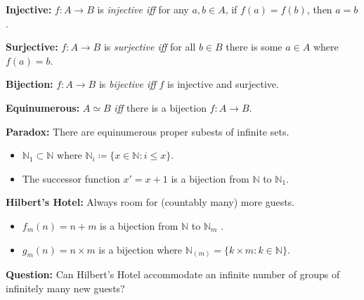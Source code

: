 \documentclass[handout]{beamer}
\newcommand{\set}[1]{\lbrace#1\rbrace} %
\newcommand{\N}{\mathbb{N}}
\begin{document}
  

\begin{frame}

  \textbf{Injective:} $f: A\to B$ is \textit{injective iff} for any $a,b\in A$, if $f(a)=f(b)$, then $a=b$. 
  \vspace{.2in}
  \pause

  \textbf{Surjective:} $f: A\to B$ is \textit{surjective iff} for all $b\in B$ there is some $a\in A$ where $f(a)=b$.
  \vspace{.2in}
  \pause

  \textbf{Bijection:} $f: A\to B$ is \textit{bijective iff} $f$ is injective and surjective. 
  \vspace{.2in}
  \pause

  \textbf{Equinumerous:} $A\simeq B$ \textit{iff} there is a bijection $f: A \to B$.
  \vspace{.2in}

\end{frame}


\begin{frame}

  \textbf{Paradox:} There are equinumerous proper subests of infinite sets.
  \pause

  \begin{itemize}
    \item $\N_1 \subset \N$ where $\N_i\coloneq\set{x \in \N : i \leq x}$.
    \item The successor function $x'= x + 1$ is a bijection from $\N$ to $\N_1$. 
  \end{itemize}
  \vspace{.2in}
  \pause


  \textbf{Hilbert's Hotel:} Always room for (countably many) more guests.
  \pause

  \begin{itemize}
    \item $f_m(n) = n + m$ is a bijection from $\N$ to $\N_m$ .
    \item $g_m(n) = n \times m$ is a bijection where $\N_{(m)}=\set{k\times m: k \in \N}$.
  \end{itemize}
  \vspace{.2in}
  \pause

  \textbf{Question:} Can Hilbert's Hotel accommodate an infinite number of groups of infinitely many new guests?

\end{frame}
\end{document}
